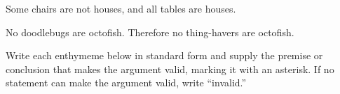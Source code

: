 \begin{exercises}
\item Some chairs are not houses, and all tables are houses.


\item No doodlebugs are octofish. Therefore no thing-havers are octofish.




\end{exercises}

\noindent \problempart Write each enthymeme below in standard form and supply the premise or conclusion that makes the argument valid, marking it with an asterisk. If no statement can make the argument valid, write ``invalid.''


